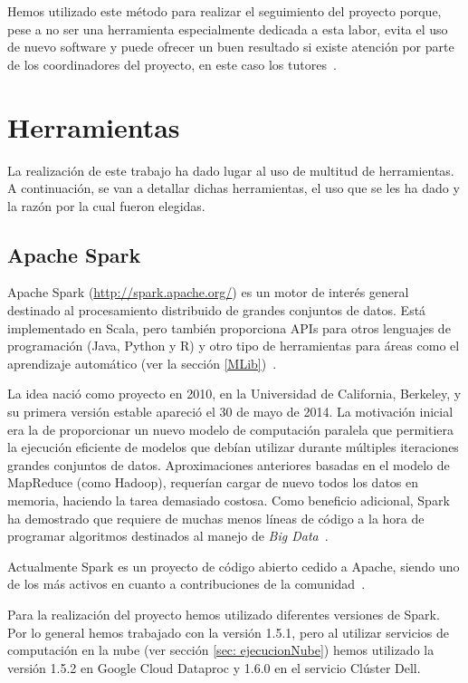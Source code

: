 Hemos utilizado este método para realizar el seguimiento del proyecto porque, pese a no ser una herramienta especialmente dedicada a esta labor, evita el uso de nuevo software y puede ofrecer un buen resultado si existe atención por parte de los coordinadores del proyecto, en este caso los tutores~\cite{WhyIssues}.


\section{Herramientas}

La realización de este trabajo ha dado lugar al uso de multitud de herramientas. A continuación, se van a detallar dichas herramientas, el uso que se les ha dado y la razón por la cual fueron elegidas.

\subsection{Apache Spark}\label{sec:DefSpark}

Apache Spark (\url{http://spark.apache.org/}) es un motor de interés general destinado al procesamiento distribuido de grandes conjuntos de datos. Está implementado en Scala, pero también proporciona APIs para otros lenguajes de programación (Java, Python y R) y otro tipo de herramientas para áreas como el aprendizaje automático (ver la sección \ref{MLib})~\cite{SparkDoc}.

La idea nació como proyecto en 2010, en la Universidad de California, Berkeley, y su primera versión estable apareció el 30 de mayo de 2014. La motivación inicial era la de proporcionar un nuevo modelo de computación paralela que permitiera la ejecución eficiente de modelos que debían utilizar durante múltiples iteraciones grandes conjuntos de datos. Aproximaciones anteriores basadas en el modelo de MapReduce \cite{MapReducePaper} (como Hadoop), requerían cargar de nuevo todos los datos en memoria, haciendo la tarea demasiado costosa. Como beneficio adicional, Spark ha demostrado que requiere de muchas menos líneas de código a la hora de programar algoritmos destinados al manejo de \textit{Big Data}~\cite{SparkPaper}.

Actualmente Spark es un proyecto de código abierto cedido a Apache, siendo uno de los más activos en cuanto a contribuciones de la comunidad~\cite{ApacheContributions}. 

Para la realización del proyecto hemos utilizado diferentes versiones de Spark. Por lo general hemos trabajado con la versión 1.5.1, pero al utilizar servicios de computación en la nube (ver sección \ref{sec: ejecucionNube}) hemos utilizado la versión 1.5.2 en Google Cloud Dataproc y 1.6.0 en el servicio Clúster Dell.

